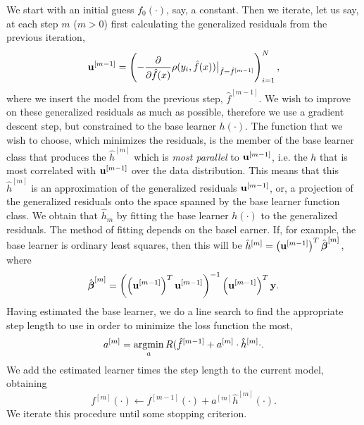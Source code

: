 We start with an initial guess $f_0(\cdot)$, say, a constant. Then we iterate, let us say, at each step $m$ ($m>0$) first calculating the generalized residuals from the previous iteration,
\begin{equation}
    \mathbf{u}^{[m-1]}=\left(-\frac{\partial}{\partial \hat{f}(x)}\rho(y_i, \hat{f}(x))\big\rvert_{\hat{f}=\hat{f}^{[m-1]}}\right)_{i=1}^N,
\end{equation}
where we insert the model from the previous step, $\hat{f}^{[m-1]}$. We wish to improve on these generalized residuals as much as possible, therefore we use a gradient descent step, but constrained to the base learner $h(\cdot)$. The function that we wish to choose, which minimizes the residuals, is the member of the base learner class that produces the $\hat{h}^{[m]}$ which is \textit{most parallel} to $\mathbf{u}^{[m-1]}$, i.e. the $h$ that is most correlated with $\mathbf{u}^{[m-1]}$ over the data distribution. This means that this $\hat{h}^{[m]}$ is an approximation of the generalized residuals $\mathbf{u}^{[m-1]}$, or, a projection of the generalized residuals onto the space spanned by the base learner function class. We obtain that $\hat{h}_m$ by fitting the base learner $h(\cdot)$ to the generalized residuals. The method of fitting depends on the basel earner. If, for example, the base learner is ordinary least squares, then this will be $\hat{h}^{[m]}=\left(\mathbf{u}^{[m-1]}\right)^T\hat{\boldsymbol{\beta}}^{[m]}$, where
\begin{equation}
    \hat{\boldsymbol{\beta}}^{[m]}=\left(\left(\mathbf{u}^{[m-1]}\right)^T\mathbf{u}^{[m-1]}\right)^{-1}\left(\mathbf{u}^{[m-1]}\right)^T\mathbf{y}.
\end{equation}
Having estimated the base learner, we do a line search to find the appropriate step length to use in order to minimize the loss function the most,
\begin{equation}
    a^{[m]}=\operatorname*{argmin}_{a}R(\hat{f}^{[m-1]}+a^{[m]}\cdot\hat{h}^{[m]}{\cdot}.
\end{equation}
We add the estimated learner times the step length to the current model, obtaining
\begin{equation}
    f^{[m]}(\cdot)\gets f^{[m-1]}(\cdot)+a^{[m]}\hat{h}^{[m]}(\cdot).
\end{equation}
We iterate this procedure until some stopping criterion.

